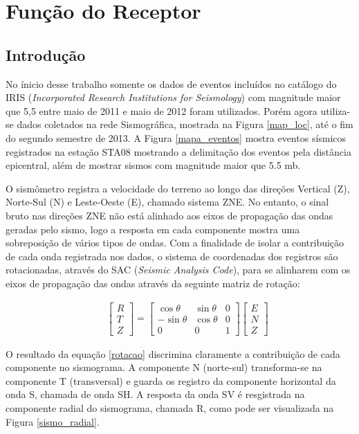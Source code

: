 \chapter{Função do Receptor}

\section{Introdução}

No ínicio desse trabalho somente os dados de eventos incluídos no catálogo do IRIS (\textit{Incorporated Research Institutions for Seismology}) com magnitude maior que 5,5 entre maio de 2011 e maio de 2012 foram utilizados. Porém agora utiliza-se dados coletados na rede Sismográfica, mostrada na Figura       \ref{map_loc}, até o fim do segundo semestre de 2013. A Figura \ref{mapa_eventos} mostra eventos sísmicos registrados na estação STA08 mostrando a delimitação dos eventos pela distância epicentral, além de mostrar sismos com magnitude maior que 5.5 mb.

O sismômetro registra a velocidade do terreno ao longo das direções Vertical (Z), Norte-Sul (N) e Leste-Oeste (E), chamado sistema ZNE. No entanto, o sinal bruto nas direções ZNE não está alinhado aos eixos de propagação das ondas geradas pelo sismo, logo a resposta em cada componente mostra uma sobreposição de vários tipos de ondas. Com a finalidade de isolar a contribuição de cada onda registrada nos dados, o sistema de coordenadas dos registros são rotacionadas, através do SAC (\textit{Seismic Analysis Code}), para se alinharem com os eixos de propagação das ondas através da seguinte matriz de rotação:

\begin{eqnarray}
 & & \left[ \begin{array}{c} R \\ T \\ Z \end{array} \right] = \begin{bmatrix} \cos \theta & \sin \theta & 0 \\ - \sin \theta & \cos \theta & 0 \\ 0 & 0 & 1 \end{bmatrix} \left[ \begin{array}{c} E \\ N \\ Z \end{array} \right]
\label{rotacao}
\end{eqnarray}

O resultado da equação \ref{rotacao} discrimina claramente a contribuição de cada componente  no sismograma. A componente N (norte-sul) transforma-se na componente T (transversal) e guarda os registro da componente horizontal da onda S, chamada de onda SH. A resposta da onda SV é resgistrada na componente radial do sismograma, chamada R, como pode ser visualizada na Figura \ref{sismo_radial}.

